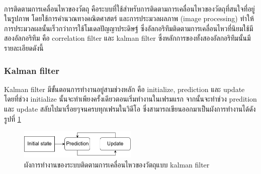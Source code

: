 การติดตามการเคลื่อนไหวของวัตถุ\textsuperscript{\cite{danelljan2014accurate}} คือระบบที่ใช้สำหรับการติดตามการเคลื่อนไหวของวัตถุที่สนใจที่อยู่ในรูปภาพ 
โดยใช้การคำนวณทางคณิตศาสตร์ และการประมวลผลภาพ (image processing) ทำให้การประมวลผลนั้นเร็วกว่าการใช้โมเดลปัญญาประดิษฐ์ ซึ่งอัลกอริทึมติดตามการเคลื่อนไหวที่นิยมใช้มีสองอัลกอริทึม
คือ correlation filter และ kalman filter ซึ่งหลักการของทั้งสองอัลกอริทึมนั้นมีรายละเอียดดังนี้
\clearpage
\subsubsection{Kalman filter}
Kalman filter มีขั้นตอนการทำงานอยู่สามช่วงหลัก คือ initialize, prediction และ update โดยที่ช่วง initialize นั้นจะทำเพียงครั้งเดียวตอนเริ่มทำงานในเฟรมแรก 
จากนั้นจะทำช่วง predition และ update สลับไปมาเรื่อยๆจนครบทุกเฟรมในวิดีโอ ซึ่งสามารถเขียนออกมาเป็นผังการทำงานได้ดังรูปที่ \ref{fig:kalman_concept}
\begin{figure}[!ht]
	\centering
	\includegraphics[width=0.5\textwidth]{chapter2/images/kalmanProcess.png}
		\caption{ผังการทำงานของระบบติดตามการเคลื่อนไหวของวัตถุแบบ kalman filter}
    	\label{fig:kalman_concept}
\end{figure}

